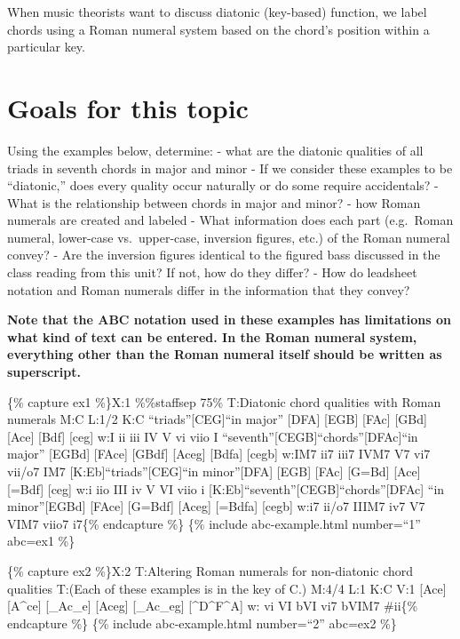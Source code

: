 \documentclass{book}
\begin{document}
When music theorists want to discuss diatonic (key-based) function, we label
chords using a Roman numeral system based on the chord's position within a
particular key.

\hypertarget{goals-for-this-topic-2}{%
\section{Goals for this topic}\label{goals-for-this-topic-2}}

Using the examples below, determine: - what are the diatonic qualities of all
triads in seventh chords in major and minor - If we consider these examples to
be ``diatonic,'' does every quality occur naturally or do some require
accidentals? - What is the relationship between chords in major and minor? -
how Roman numerals are created and labeled - What information does each part
(e.g.~Roman numeral, lower-case vs.~upper-case, inversion figures, etc.) of
the Roman numeral convey? - Are the inversion figures identical to the figured
bass discussed in the class reading from this unit? If not, how do they
differ? - How do leadsheet notation and Roman numerals differ in the
information that they convey?

\textbf{Note that the ABC notation used in these examples has limitations on
what kind of text can be entered. In the Roman numeral system, everything
other than the Roman numeral itself should be written as superscript.}

\{\% capture ex1 \%\}X:1 \%\%staffsep 75\% T:Diatonic chord qualities with
Roman numerals M:C L:1/2 K:C ``triads''{[}CEG{]}``in major''
{[}DFA{]}\textbar{} {[}EGB{]} {[}FAc{]}\textbar{} {[}GBd{]}
{[}Ace{]}\textbar{} {[}Bdf{]} {[}ceg{]}\textbar\textbar{} w:I ii iii IV V vi
viio I ``seventh''{[}CEGB{]}``chords''{[}DFAc{]}\textbar{}``in major''
{[}EGBd{]} {[}FAce{]}\textbar{} {[}GBdf{]} {[}Aceg{]}\textbar{} {[}Bdfa{]}
{[}cegb{]}\textbar\textbar{} w:IM7 ii7 iii7 IVM7 V7 vi7 vii/o7 IM7
{[}K:Eb{]}``triads''{[}CEG{]}``in minor''{[}DFA{]}\textbar{} {[}EGB{]}
{[}FAc{]}\textbar{} {[}G=Bd{]} {[}Ace{]}\textbar{} {[}=Bdf{]}
{[}ceg{]}\textbar\textbar{} w:i iio III iv V VI viio i
{[}K:Eb{]}``seventh''{[}CEGB{]}``chords''{[}DFAc{]}\textbar{} ``in
minor''{[}EGBd{]} {[}FAce{]}\textbar{} {[}G=Bdf{]} {[}Aceg{]}\textbar{}
{[}=Bdfa{]} {[}cegb{]}\textbar\textbar{} w:i7 ii/o7 IIIM7 iv7 V7 VIM7 viio7
i7\{\% endcapture \%\} \{\% include abc-example.html number=``1'' abc=ex1 \%\}

\{\% capture ex2 \%\}X:2 T:Altering Roman numerals for non-diatonic chord
qualities T:(Each of these examples is in the key of C.) M:4/4 L:1 K:C V:1
{[}Ace{]}\textbar{} {[}A\^{}ce{]}\textbar{} {[}\_Ac\_e{]}\textbar{}
{[}Aceg{]}\textbar{} {[}\_Ac\_eg{]}\textbar{} {[}\^{}D\^{}F\^{}A{]}\textbar{}
w: vi VI bVI vi7 bVIM7 \#ii\{\% endcapture \%\} \{\% include abc-example.html
number=``2'' abc=ex2 \%\}
\end{document}
